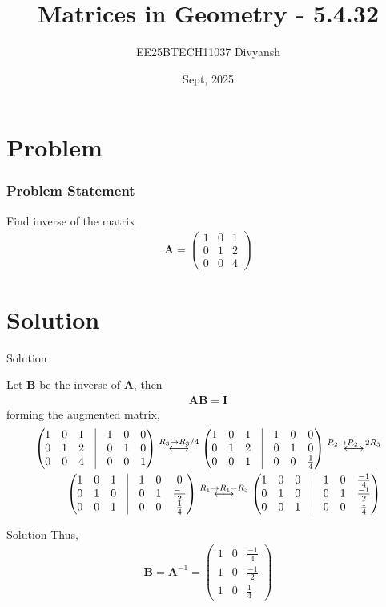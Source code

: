 \documentclass{beamer}
\title{Matrices in Geometry - 5.4.32}
\author{EE25BTECH11037  Divyansh}
\date{Sept, 2025}
\let\vec\mathbf
\theoremstyle{remark}
\newcommand{\myvec}[1]{\ensuremath{\begin{pmatrix}#1\end{pmatrix}}}
\begin{document}
\maketitle


\section{Problem}
\begin{frame}
\frametitle{Problem Statement}
Find inverse of the matrix 
\begin{align*}
    \vec{A}=\myvec{1 & 0 & 1 \\ 0 & 1 & 2 \\ 0 & 0 & 4}
\end{align*}
\end{frame}

\section{Solution}
\begin{frame}{Solution}
   
Let $\vec{B}$ be the inverse of $\vec{A}$, then
\begin{align}
    \vec{A}\vec{B}=\vec{I}
\end{align}
forming the augmented matrix,
\begin{align}
    \myvec{1 & 0 & 1 & \vrule &1 & 0 & 0\\ 0 & 1 & 2 & \vrule & 0 & 1 & 0\\ 0 & 0 & 4 &\vrule & 0 & 0&1}\overset{R_3 \rightarrow R_3 /4 }{\longleftrightarrow} 
    \myvec{1 & 0 & 1 & \vrule &1 & 0 & 0\\ 0 & 1 & 2 & \vrule & 0 & 1 & 0\\ 0 & 0 & 1 &\vrule & 0 & 0&\frac{1}{4}}\overset{R_2 \rightarrow R_2 - 2R_3 }{\longleftrightarrow}\\
    \myvec{1 & 0 & 1 & \vrule &1 & 0 & 0\\ 0 & 1 & 0 & \vrule & 0 & 1 & \frac{-1}{2}\\ 0 & 0 & 1 &\vrule & 0 & 0&\frac{1}{4}}
    \overset{R_1 \rightarrow R_1 - R_3 }{\longleftrightarrow}
    \myvec{1 & 0 & 0 & \vrule &1 & 0 & \frac{-1}{4}\\ 0 & 1 & 0 & \vrule & 0 & 1 & \frac{-1}{2}\\ 0 & 0 & 1 &\vrule & 0 & 0&\frac{1}{4}}
\end{align}

\end{frame}

\begin{frame}{Solution}
Thus, 
\begin{align}
    \vec{B}=\vec{A}^{-1}=\myvec{1 & 0 & \frac{-1}{4} \\ 1 & 0 & \frac{-1}{2} \\1 & 0 & \frac{1}{4}}
\end{align}
\end{frame}
\end{document}
